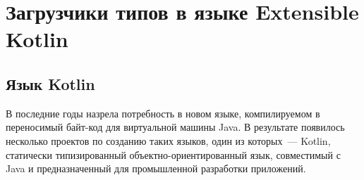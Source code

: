 \section{Загрузчики типов в языке Extensible Kotlin}
\subsection{Язык Kotlin}
В последние годы назрела потребность в новом языке, компилируемом в переносимый байт-код для виртуальной машины Java.
В результате появилось несколько проектов по созданию таких языков, один из которых~--- Kotlin,
статически типизированный объектно-ориентированный язык, совместимый с Java и предназначенный для промышленной разработки приложений.

